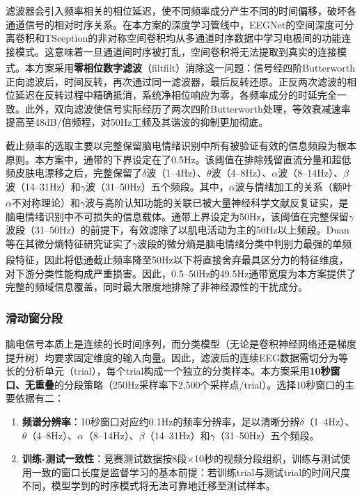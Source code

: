 \documentclass[UTF8,zihao=-4,fontset=windows]{ctexart}
\let\oldcite\cite
\renewcommand{\cite}[1]{\textsuperscript{\oldcite{#1}}}
\numberwithin{equation}{section}
\numberwithin{figure}{section}
\numberwithin{table}{section}
\begin{document}
滤波器会引入频率相关的相位延迟，使不同频率成分产生不同的时间偏移，破坏各通道信号的相对时序关系。在本方案的深度学习管线中，EEGNet的空间深度可分离卷积和TSception的非对称空间卷积均从多通道时序数据中学习电极间的功能连接模式。这意味着一旦通道间时序被打乱，空间卷积将无法提取到真实的连接模式。本方案采用\textbf{零相位数字滤波}（filtfilt）消除这一问题\cite{eeg_preprocessing}：信号经四阶Butterworth正向滤波后，时间反转，再次通过同一滤波器，最后反转还原。正反两次滤波的相位延迟在反转过程中精确抵消，系统净相位响应为零，各频率成分的时延完全一致。此外，双向滤波使信号实际经历了两次四阶Butterworth处理，等效衰减速率提高至48dB/倍频程，对50Hz工频及其谐波的抑制更加彻底。

截止频率的选取主要以完整保留脑电情绪识别中所有被验证有效的信息频段为根本原则。本方案中，通带的下界设定在了0.5Hz。该阈值在排除残留直流分量和超低频皮肤电漂移之后，完整保留了$\delta$波（1--4Hz）、$\theta$波（4--8Hz）、$\alpha$波（8--14Hz）、$\beta$波（14--31Hz）和$\gamma$波（31--50Hz）五个频段。其中，$\alpha$波与情绪加工的关系（额叶$\alpha$不对称理论\cite{coan}）和$\gamma$波与高阶认知功能的关联已被大量神经科学文献反复证实，是脑电情绪识别中不可损失的信息载体。通带上界设定为50Hz，该阈值在完整保留$\gamma$波段（31--50Hz）的前提下，有效滤除了以肌电活动为主的50Hz以上频段。Duan等在其微分熵特征研究证实了$\gamma$波段的微分熵是脑电情绪分类中判别力最强的单频段特征\cite{duan_de}，因此将低通截止频率降至50Hz以下将直接舍弃最具区分力的特征维度，对下游分类性能构成严重损害。因此，0.5--50Hz的49.5Hz通带宽度为本方案提供了完整的频域信息覆盖，同时最大限度地排除了非神经源性的干扰成分。

\subsubsection{滑动窗分段}

脑电信号本质上是连续的长时间序列，而分类模型（无论是卷积神经网络还是梯度提升树）均要求固定维度的输入向量。因此，滤波后的连续EEG数据需切分为等长的分析单元（trial），每个trial构成一个独立的分类样本。本方案采用\textbf{10秒窗口、无重叠}的分段策略（250Hz采样率下2,500个采样点/trial）。选择10秒窗口的主要依据有二：
\begin{enumerate}[label={(\arabic*)}, labelindent=2em, leftmargin=4.5em, itemindent=0pt, labelsep=0.5em]
    \item \textbf{频谱分辨率}：10秒窗口对应约0.1Hz的频率分辨率，足以清晰分辨$\delta$（1--4Hz）、$\theta$（4--8Hz）、$\alpha$（8--14Hz）、$\beta$（14--31Hz）和$\gamma$（31--50Hz）五个频段。
    \item \textbf{训练-测试一致性}：竞赛测试数据按8段×10秒的视频分段组织，训练与测试使用一致的窗口长度是监督学习的基本前提：若训练trial与测试trial的时间尺度不同，模型学到的时序模式将无法可靠地迁移至测试样本。
\end{enumerate}
\end{document}
